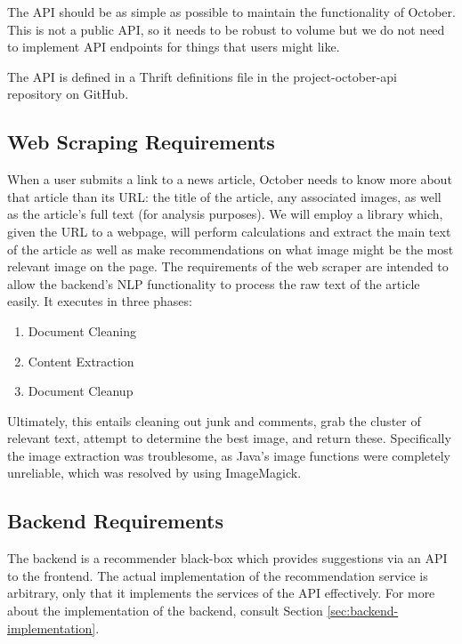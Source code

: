 \documentclass[11pt,letterpaper]{article}
\begin{document}
The API should be as simple as possible to maintain the functionality of October. This is not a public API, so it needs to be robust to volume but we do not need to implement API endpoints for things that users might like.

The API is defined in a Thrift definitions file in the project-october-api repository on GitHub\cite{project-october-api}.

\subsection{Web Scraping Requirements}
\label{sec:scraping}
When a user submits a link to a news article, October needs to know more about that article than its URL: the title of the article, any associated images, as well as the article's full text (for analysis purposes).
We will employ a library which, given the URL to a webpage, will perform calculations and extract the main text of the article as well as make recommendations on what image might be the most relevant image on the page.
The requirements of the web scraper are intended to allow the backend's NLP functionality to process the raw text of the article easily. It executes in three phases:
\begin{enumerate}
  \item Document Cleaning
  \item Content Extraction
  \item Document Cleanup
\end{enumerate}
Ultimately, this entails cleaning out junk and comments, grab the cluster of relevant text, attempt to determine the best image, and return these. Specifically the image extraction was troublesome, as Java's image functions were completely unreliable, which was resolved by using ImageMagick.

\subsection{Backend Requirements} %
The backend is a recommender black-box which provides suggestions via an API to the frontend.
The actual implementation of the recommendation service is arbitrary, only that it implements the services of the API effectively.
For more about the implementation of the backend, consult Section \ref{sec:backend-implementation}.
\end{document}
